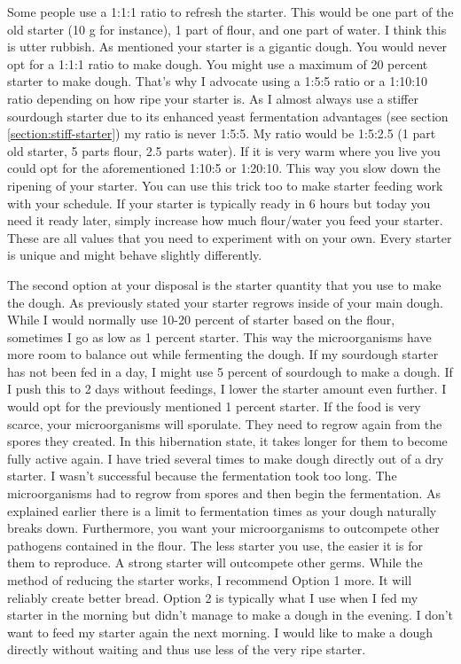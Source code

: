 Some people use a 1:1:1 ratio to refresh the starter. This would
be one part of the old starter (10 g for instance), 1 part of flour,
and one part of water. I think this is utter rubbish. As mentioned
your starter is a gigantic dough. You would never opt for a 1:1:1 ratio to
make dough. You might use a maximum of 20 percent starter to
make dough. That's why I advocate using a 1:5:5 ratio or a
1:10:10 ratio depending on how ripe your starter is. As I almost
always use a stiffer sourdough starter due to its enhanced
yeast fermentation advantages (see section \ref{section:stiff-starter})
my ratio is never 1:5:5. My ratio would be 1:5:2.5 (1 part old starter,
5 parts flour, 2.5 parts water). If it is very warm where you live
you could opt for the aforementioned 1:10:5 or 1:20:10. This
way you slow down the ripening of your starter. You can use this
trick too to make starter feeding work with your schedule.
If your starter is typically ready in 6 hours but today you need it
ready later, simply increase how much flour/water you feed your starter.
These are all values that you need to experiment with on your own.
Every starter is unique and might behave slightly differently.

The second option at your disposal is the starter quantity that
you use to make the dough. As previously stated your starter
regrows inside of your main dough. While I would normally use
10-20 percent of starter based on the flour, sometimes I go
as low as 1 percent starter. This way the microorganisms have
more room to balance out while fermenting the dough. If my sourdough
starter has not been fed in a day, I might use 5 percent of sourdough
to make a dough. If I push this to 2 days without feedings,
I lower the starter amount even further. I would opt for the
previously mentioned 1 percent starter. If the food is very scarce,
your microorganisms will sporulate. They need to regrow again
from the spores they created. In this hibernation state, it takes
longer for them to become fully active again. I have tried
several times to make dough directly out of a dry starter.
I wasn't successful because the fermentation took too long.
The microorganisms had to regrow from spores and then begin
the fermentation. As explained earlier there is a limit to
fermentation times as your dough naturally breaks down.
Furthermore, you want your microorganisms to outcompete
other pathogens contained in the flour. The less starter
you use, the easier it is for them to reproduce. A strong
starter will outcompete other germs. While the method of
reducing the starter works, I recommend Option 1 more.
It will reliably create better bread. Option 2 is typically
what I use when I fed my starter in the morning but didn't
manage to make a dough in the evening. I don't want to feed
my starter again the next morning. I would like to make a dough
directly without waiting and thus use less of the very ripe starter.

